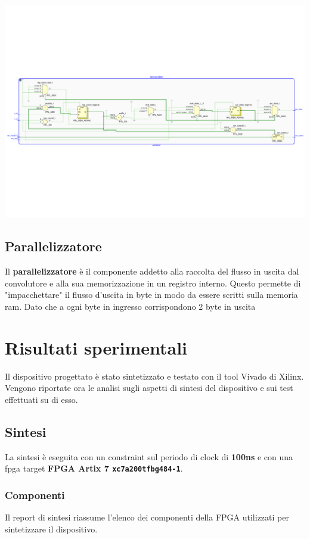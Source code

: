\documentclass[a4paper]{report}
\begin{document}
\includegraphics[scale = 0.45]{schematics/serializer.pdf}

\section{Parallelizzatore}
Il \textbf{parallelizzatore} è il componente addetto alla raccolta del flusso in uscita dal convolutore e alla sua memorizzazione in un registro interno. Questo permette di "impacchettare" il flusso d'uscita in byte in modo da essere scritti sulla memoria ram. 
Dato che a ogni byte in ingresso corrispondono 2 byte in uscita 



\chapter{Risultati sperimentali}
Il dispositivo progettato è stato sintetizzato e testato con il tool Vivado di Xilinx. Vengono riportate ora le analisi sugli aspetti di sintesi del dispositivo e sui test effettuati su di esso.

\section{Sintesi}
La sintesi è eseguita con un constraint sul periodo di clock di \textbf{100ns} e con una fpga target \textbf{FPGA Artix 7 \texttt{xc7a200tfbg484-1}}.
\subsection{Componenti}
Il report di sintesi riassume l'elenco dei componenti della FPGA utilizzati per sintetizzare il dispositivo.
\end{document}
